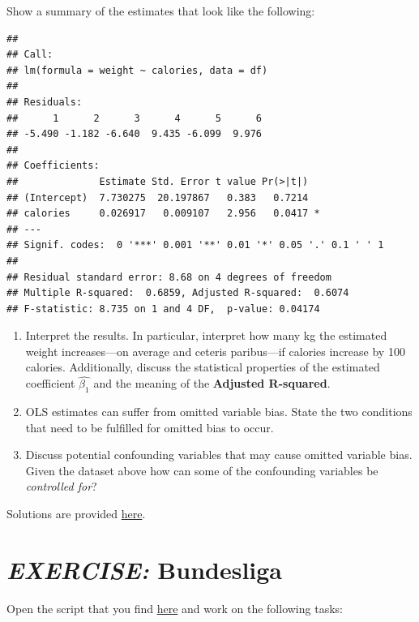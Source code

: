\documentclass[
  12pt,
  oneside]{book}
\begin{document}
Show a summary of the estimates that look like the following:

\begin{verbatim}
## 
## Call:
## lm(formula = weight ~ calories, data = df)
## 
## Residuals:
##      1      2      3      4      5      6 
## -5.490 -1.182 -6.640  9.435 -6.099  9.976 
## 
## Coefficients:
##              Estimate Std. Error t value Pr(>|t|)  
## (Intercept)  7.730275  20.197867   0.383   0.7214  
## calories     0.026917   0.009107   2.956   0.0417 *
## ---
## Signif. codes:  0 '***' 0.001 '**' 0.01 '*' 0.05 '.' 0.1 ' ' 1
## 
## Residual standard error: 8.68 on 4 degrees of freedom
## Multiple R-squared:  0.6859, Adjusted R-squared:  0.6074 
## F-statistic: 8.735 on 1 and 4 DF,  p-value: 0.04174
\end{verbatim}

\begin{enumerate}
\def\labelenumi{\alph{enumi})}
\setcounter{enumi}{14}
\item
  Interpret the results. In particular, interpret how many kg the estimated weight increases---on average and ceteris paribus---if calories increase by 100 calories. Additionally, discuss the statistical properties of the estimated coefficient \(\hat{\beta_1}\) and the meaning of the \textbf{Adjusted R-squared}.
\item
  OLS estimates can suffer from omitted variable bias. State the two conditions that need to be fulfilled for omitted bias to occur.
\item
  Discuss potential confounding variables that may cause omitted variable bias. Given the dataset above how can some of the confounding variables be \emph{controlled for}?
\end{enumerate}

Solutions are provided \href{https://raw.githubusercontent.com/hubchev/courses/main/scr/exe_calories.R}{here}.

\hypertarget{exercise-bundesliga}{%
\section*{\texorpdfstring{\emph{EXERCISE:} Bundesliga}{EXERCISE: Bundesliga}}\label{exercise-bundesliga}}

Open the script that you find \href{https://raw.githubusercontent.com/hubchev/courses/main/scr/dfb.R}{here} and work on the following tasks:
\end{document}
